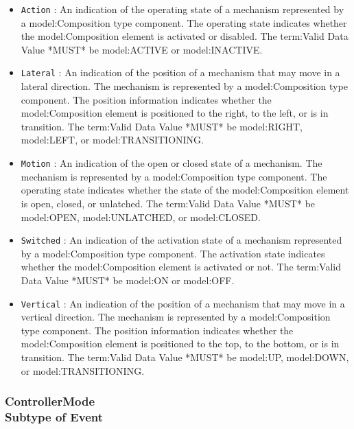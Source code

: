 \begin{itemize}

\item \texttt{Action} : An indication of the operating state of a mechanism represented by a {model:Composition} type component.
 The operating state indicates whether the {model:Composition} element is activated or disabled. 
 The {term:Valid Data Value} *MUST* be {model:ACTIVE} or {model:INACTIVE}.

\item \texttt{Lateral} : An indication of the position of a mechanism that may move in a lateral direction.   The mechanism is represented by a {model:Composition} type component. 
 The position information indicates whether the {model:Composition} element is positioned to the right, to the left, or is in transition.  
 The {term:Valid Data Value} *MUST* be {model:RIGHT}, {model:LEFT}, or {model:TRANSITIONING}.

\item \texttt{Motion} : An indication of the open or closed state of a mechanism.   The mechanism is represented by a {model:Composition} type component. 
 The operating state indicates whether the state of the {model:Composition} element is open, closed, or unlatched.   
 The {term:Valid Data Value} *MUST* be {model:OPEN}, {model:UNLATCHED}, or {model:CLOSED}.

\item \texttt{Switched} : An indication of the activation state of a mechanism represented by a {model:Composition} type component.
 The activation state indicates whether the {model:Composition} element is activated or not.
 The {term:Valid Data Value} *MUST* be {model:ON} or {model:OFF}.

\item \texttt{Vertical} : An indication of the position of a mechanism that may move in a vertical direction. The mechanism is represented by a {model:Composition} type component. 
 The position information indicates whether the {model:Composition} element is positioned to the top, to the bottom, or is in transition.  
 The {term:Valid Data Value} *MUST* be {model:UP}, {model:DOWN}, or {model:TRANSITIONING}.

\end{itemize}

\FloatBarrier
\subsubsection[ControllerMode]{ControllerMode \\ {\small Subtype of Event}}
  \label{type:ControllerMode}

